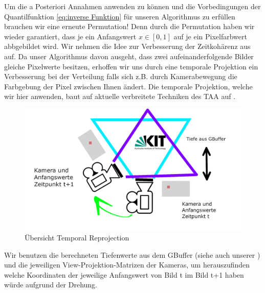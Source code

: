 
\par 

Um die a Posteriori Annahmen anwenden zu können und die Vorbedingungen der Quantilfunktion \ref{eq:inverse Funktion}
für unseren Algorithmus zu erfüllen brauchen wir eine erneute Permutation! Denn durch die Permutation haben wir wieder garantiert, 
dass je ein Anfangswert $x \in [0,1]$ auf je ein Pixelfarbwert abbgebildet wird. Wir nehmen die Idee zur Verbesserung der Zeitkohärenz
aus \cite[S.9/10]{hal02158423} auf. Da unser Algorithmus davon ausgeht, dass zwei aufeinanderfolgende Bilder gleiche Pixelwerte 
besitzen, erhoffen wir uns durch eine temporale Projektion ein Verbesserung bei der  Verteilung 
falls sich z.B. durch Kamerabewegung die Farbgebung der Pixel zwischen Ihnen ändert. Die temporale Projektion, welche wir hier 
anwenden, baut auf aktuelle verbreitete Techniken des TAA auf \cite{INSIDETAA}.

\begin{figure}[H]
        \centering
        \includegraphics[width=\linewidth]{content/TemporalerAlg/Bilder/Reprojection/TemporalReprojectPrincipal.png}
        \caption{Übersicht Temporal Reprojection}
        \label{pic:Uebersicht_Temporal_Reprojection}
\end{figure}

Wir benutzen die berechneten Tiefenwerte aus dem GBuffer (siehe auch unserer ) und die jeweiligen 
View-Projektion-Matrizen der Kameras, um herauszufinden welche Koordinaten der jeweilige Anfangswert von Bild t im Bild t+1 
haben würde aufgrund der Drehung.
\par 

\newpage

